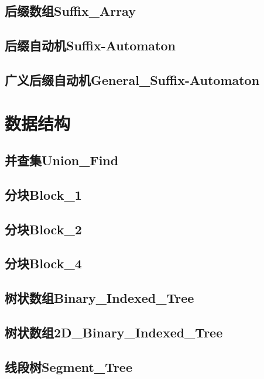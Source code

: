 \documentclass[10pt,a4paper]{article}
\begin{document}
\subsection{后缀数组Suffix\_Array}

\subsection{后缀自动机Suffix-Automaton}

\subsection{广义后缀自动机General\_Suffix-Automaton}


\newpage
\section{数据结构}
\subsection{并查集Union\_Find}

\subsection{分块Block\_1}

\subsection{分块Block\_2}

\subsection{分块Block\_4}

\subsection{树状数组Binary\_Indexed\_Tree}

\subsection{树状数组2D\_Binary\_Indexed\_Tree}

\subsection{线段树Segment\_Tree}

\end{document}
